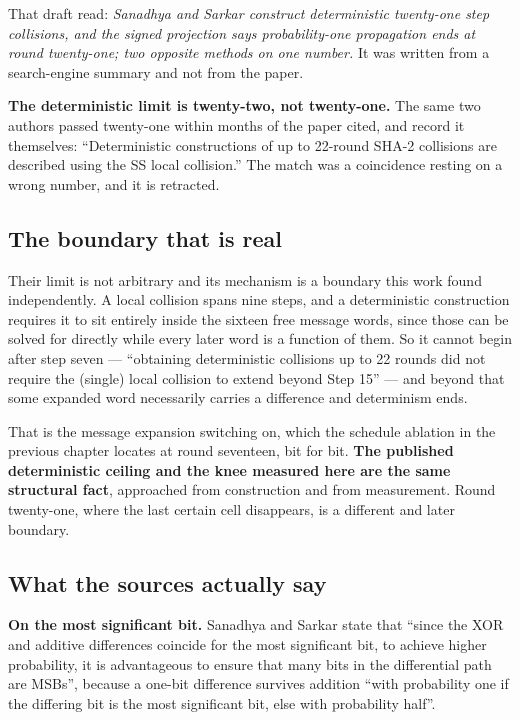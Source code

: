 That draft read: \emph{Sanadhya and Sarkar construct deterministic twenty-one step collisions, and
the signed projection says probability-one propagation ends at round twenty-one; two opposite
methods on one number.} It was written from a search-engine summary and not from the paper.

\textbf{The deterministic limit is twenty-two, not twenty-one.} The same two authors passed
twenty-one within months of the paper cited, and record it themselves: ``Deterministic constructions
of up to 22-round SHA-2 collisions are described using the SS local collision.'' The match was a
coincidence resting on a wrong number, and it is retracted.

\subsection{The boundary that is real}

Their limit is not arbitrary and its mechanism is a boundary this work found independently. A local
collision spans nine steps, and a deterministic construction requires it to sit entirely inside the
sixteen free message words, since those can be solved for directly while every later word is a
function of them. So it cannot begin after step seven --- ``obtaining deterministic collisions up to
22 rounds did not require the (single) local collision to extend beyond Step 15'' --- and beyond
that some expanded word necessarily carries a difference and determinism ends.

That is the message expansion switching on, which the schedule ablation in the previous chapter
locates at round seventeen, bit for bit. \textbf{The published deterministic ceiling and the knee
measured here are the same structural fact}, approached from construction and from measurement.
Round twenty-one, where the last certain cell disappears, is a different and later boundary.

\subsection{What the sources actually say}

\textbf{On the most significant bit.} Sanadhya and Sarkar state that ``since the XOR and additive
differences coincide for the most significant bit, to achieve higher probability, it is advantageous
to ensure that many bits in the differential path are MSBs'', because a one-bit difference survives
addition ``with probability one if the differing bit is the most significant bit, else with
probability half''.

